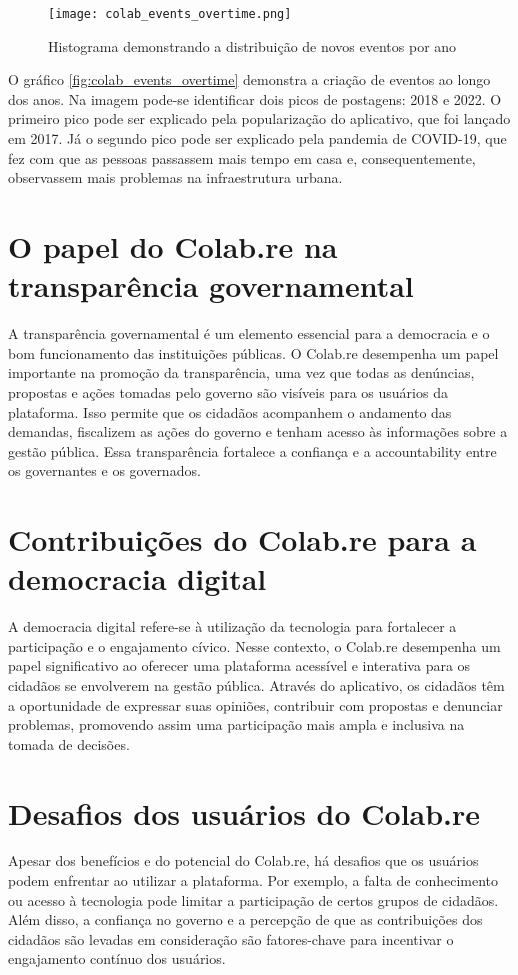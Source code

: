 \begin{figure}[!htb]
    \caption{Histograma demonstrando a distribuição de novos eventos por ano}
    \label{fig:colab_events_overtime}
    \centering
    \texttt{[image: colab\_events\_overtime.png]}
\end{figure}

O gráfico \autoref{fig:colab_events_overtime} demonstra a criação de eventos ao longo dos anos. Na imagem pode-se identificar dois picos de postagens: 2018 e 2022. O primeiro pico pode ser explicado pela popularização do aplicativo, que foi lançado em 2017. Já o segundo pico pode ser explicado pela pandemia de COVID-19, que fez com que as pessoas passassem mais tempo em casa e, consequentemente, observassem mais problemas na infraestrutura urbana.

\section*{O papel do Colab.re na transparência governamental}
A transparência governamental é um elemento essencial para a democracia e o bom funcionamento das instituições públicas. O Colab.re desempenha um papel importante na promoção da transparência, uma vez que todas as denúncias, propostas e ações tomadas pelo governo são visíveis para os usuários da plataforma. Isso permite que os cidadãos acompanhem o andamento das demandas, fiscalizem as ações do governo e tenham acesso às informações sobre a gestão pública. Essa transparência fortalece a confiança e a accountability entre os governantes e os governados.

\section*{Contribuições do Colab.re para a democracia digital}
A democracia digital refere-se à utilização da tecnologia para fortalecer a participação e o engajamento cívico. Nesse contexto, o Colab.re desempenha um papel significativo ao oferecer uma plataforma acessível e interativa para os cidadãos se envolverem na gestão pública. Através do aplicativo, os cidadãos têm a oportunidade de expressar suas opiniões, contribuir com propostas e denunciar problemas, promovendo assim uma participação mais ampla e inclusiva na tomada de decisões.

\section*{Desafios dos usuários do Colab.re}
Apesar dos benefícios e do potencial do Colab.re, há desafios que os usuários podem enfrentar ao utilizar a plataforma. Por exemplo, a falta de conhecimento ou acesso à tecnologia pode limitar a participação de certos grupos de cidadãos. Além disso, a confiança no governo e a percepção de que as contribuições dos cidadãos são levadas em consideração são fatores-chave para incentivar o engajamento contínuo dos usuários.

